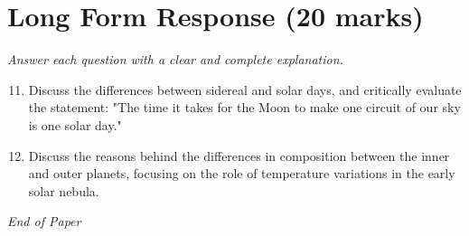 \documentclass[12pt]{article}
\begin{document}
\section*{Long Form Response (20 marks)}
\textit{Answer each question with a clear and complete explanation.}
\begin{enumerate}[label=\arabic*.]
\setcounter{enumi}{10}
\item Discuss the differences between sidereal and solar days, and critically evaluate the statement: "The time it takes for the Moon to make one circuit of our sky is one solar day."
\item Discuss the reasons behind the differences in composition between the inner and outer planets, focusing on the role of temperature variations in the early solar nebula.
\end{enumerate}

\vfill
\noindent\textit{End of Paper}
\end{document}
